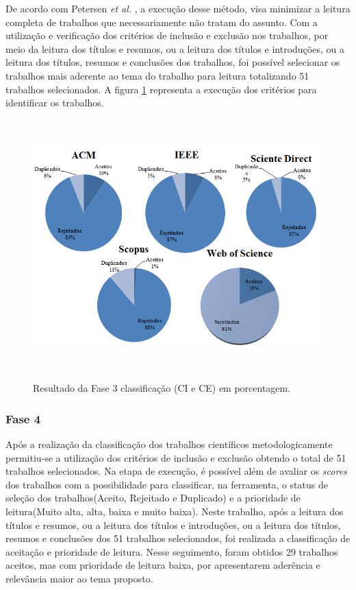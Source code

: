 De acordo com Petersen \textit{et al.} \cite{petersen2008systematic}, a execução desse método, visa minimizar a leitura completa de trabalhos que necessariamente não tratam do assunto. Com a utilização e verificação dos critérios de inclusão e exclusão nos trabalhos, por meio da leitura dos títulos e resumos, ou a leitura dos títulos e introduções, ou a leitura dos títulos, resumos e conclusões dos trabalhos, foi possível selecionar os trabalhos mais aderente ao tema do trabalho para leitura totalizando 51 trabalhos selecionados. A figura \ref{fig:fase3Criterios} representa a execução dos critérios para identificar os trabalhos.

\begin{figure}[H]
\centering
\includegraphics[width = 13cm, height=10cm]{img/Classificacao_FASE_3_CI_e_CE.png}
\caption{Resultado da Fase 3 classificação (CI e CE) em porcentagem.}
\label{fig:fase3Criterios}
\end{figure}

\subsubsection{Fase 4} Após a realização da classificação dos trabalhos científicos metodologicamente permitiu-se a utilização dos critérios de inclusão e exclusão obtendo o total de 51 trabalhos selecionados. Na etapa de execução, é possível além de avaliar os \textit{scores} dos trabalhos com a possibilidade para classificar, na ferramenta, o status de seleção dos trabalhos(Aceito, Rejeitado e Duplicado) e a prioridade de leitura(Muito alta, alta, baixa e muito baixa). Neste trabalho, após a leitura dos títulos e resumos, ou a leitura dos títulos e introduções, ou a leitura dos títulos, resumos e conclusões dos 51 trabalhos selecionados, foi realizada a classificação de aceitação e prioridade de leitura. Nesse seguimento, foram obtidos 29 trabalhos aceitos, mas com prioridade de leitura baixa, por apresentarem aderência e relevância maior ao tema proposto.

